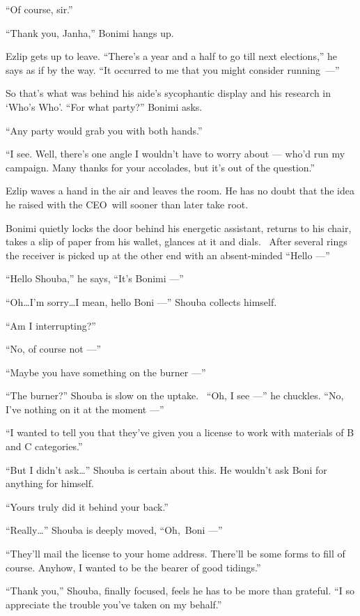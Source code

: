 \documentclass[twoside,11pt,openany]{book}
\begin{document}
``Of course, sir.''

``Thank you, Janha,'' Bonimi hangs up.

Ezlip gets up to leave. ``There's a year and a half to go till next elections,'' he says as if
by the way. ``It occurred to me that you might consider \hbox{running ---''}

So that's what was behind his aide's sycophantic display{ }and his research in  `Who's Who'.
``For what party?'' Bonimi asks.

``Any party would grab you with both hands.''

``I see. Well, there's one angle I wouldn't have to worry about --- who'd run my campaign. Many thanks for
your accolades, but it's out of the question.''

Ezlip waves a hand in the air and leaves the room. He has no doubt that the idea he raised with the CEO~will sooner than
later take root{. }

Bonimi quietly locks the door behind his energetic assistant, returns to his chair, takes a slip of paper from his
wallet, glances at it and dials.~ After several rings the receiver is picked up at the other end with an absent-minded
``Hello ---''

``Hello Shouba,'' he says, ``It's Bonimi ---''

``Oh{\ldots}I'm sorry{\ldots}I mean, hello Boni ---'' Shouba collects himself.

``Am I interrupting?''

``No, of course not ---''

``Maybe you have something on the burner ---''

``The burner?'' Shouba is slow on the uptake. ~``Oh, I see ---'' he
chuckles. ``No, I've nothing on it at the moment ---''

``I wanted to tell you that they've given you a license to work with materials of B and C
categories.''

``But I didn't ask{\ldots}'' Shouba is certain about this. He wouldn't ask Boni for anything
for himself.

``Yours truly did it behind your back.''

``Really{\ldots}'' Shouba is deeply moved, ``Oh,~Boni ---''

``They'll mail the license to your home address. There'll be some forms to fill of course. Anyhow, I wanted
to be the bearer of good tidings.''

``Thank you,'' Shouba, finally focused, feels he has to be more than grateful.
``I so appreciate the trouble you've taken on my behalf.''
\end{document}
